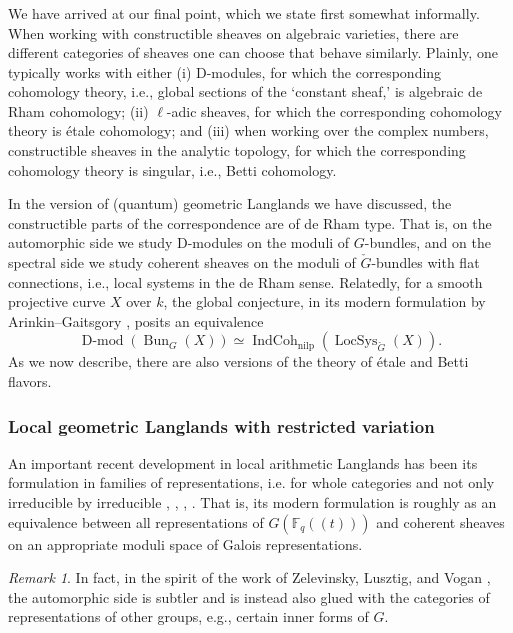 \documentclass[10pt]{amsart}
\newcommand{\ICn}{\on{IndCoh}_{\on{nilp}}}
\newcommand{\LS}{\on{LocSys}_{\cG}}
\newcommand{\Fqt}{\Fq(\!(t)\!)}
\newcommand{\on}{\operatorname}
\newcommand{\Dmod}{\on{D-mod}}
\newcommand{\Fq}{\mathbb{F}_q}
\theoremstyle{remark}
\newtheorem{re}[subsubsection]{Remark}
\newcommand{\Bun}{\operatorname{Bun}}
\numberwithin{equation}{section}
\newcommand{\cG}{\check{G}}
\begin{document}
	
	
	\subsubsection{}  We have arrived at our final point, 
	which we state first somewhat informally. When working with constructible 
	sheaves on algebraic varieties, there are different categories of sheaves 
	one can choose that behave similarly. Plainly, one typically works  with 
	either (i) D-modules, for which the corresponding cohomology theory, i.e., 
	global sections of the `constant sheaf,' is algebraic de Rham cohomology; (ii) $\ell$-adic sheaves, for which the corresponding cohomology theory is 
	\'etale cohomology; and (iii) when working over the complex 
	numbers, constructible sheaves in the analytic topology, for which the 
	corresponding cohomology theory is singular, i.e., Betti cohomology. 
	 
	In the version of (quantum) geometric Langlands we have discussed, the 
	constructible parts of the correspondence are of de Rham type. That is, on 
	the automorphic side we study D-modules on the moduli of $G$-bundles, and on 
	the spectral side we study coherent sheaves on the moduli of 
	$\cG$-bundles with flat connections, i.e., local systems in the de Rham 
	sense. Relatedly, for a smooth projective curve $X$ over $k$, the global conjecture, in its modern formulation by Arinkin--Gaitsgory \cite{arinkingaitssingsupp}, posits an equivalence
	\[
	\Dmod(\Bun_G(X)) \simeq \ICn(\LS(X)). 
	\]
	As we now describe, there are also versions of the theory of \'etale  
	and Betti flavors. 
	
	
	
	\subsubsection{Local geometric Langlands with restricted variation} An 
	important recent development in local arithmetic Langlands has been its 
	formulation in families of representations, i.e. for whole categories and not only irreducible by 
	irreducible \cite{emertonhelm}, \cite{hellmann}, \cite{zhufamilies}, \cite{farguescholze}. That is, its modern formulation is roughly as 
	an equivalence between all
	representations of $G(\Fqt)$ and coherent sheaves on an appropriate moduli 
	space of Galois representations.
	
	\begin{re} In fact, in the spirit of the work of Zelevinsky, Lusztig, and Vogan \cite{voganloclang}, the automorphic side is subtler and is instead also glued with the categories of representations of other groups, e.g., certain inner forms of $G$.  
	\end{re} 
	
\end{document}
